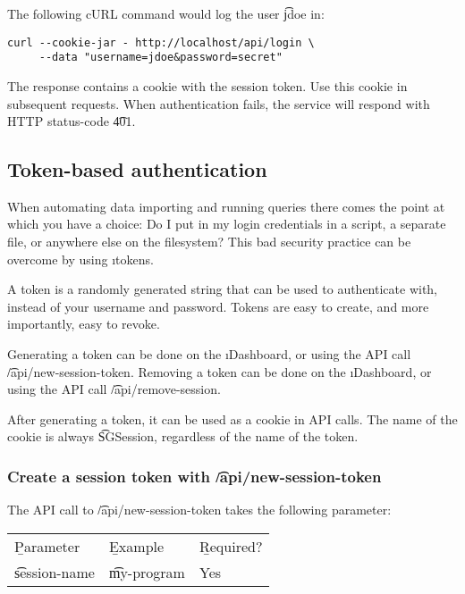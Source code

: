   The following cURL command would log the user \t{jdoe} in:

\begin{lstlisting}
curl --cookie-jar - http://localhost/api/login \
     --data "username=jdoe&password=secret"
\end{lstlisting}

  The response contains a cookie with the session token.  Use this cookie in
  subsequent requests.  When authentication fails, the service will respond
  with HTTP status-code \t{401}.

\subsection{Token-based authentication}
\label{sec:tokens}

  When automating data importing and running queries there comes the point
  at which you have a choice: Do I put in my login credentials in a script,
  a separate file, or anywhere else on the filesystem?  This bad security
  practice can be overcome by using \i{tokens}.

  A token is a randomly generated string that can be used to authenticate
  with, instead of your username and password.  Tokens are easy to create,
  and more importantly, easy to revoke.

  Generating a token can be done on the \i{Dashboard}, or using the API call
  \t{/api/new-session-token}.  Removing a token can be done on the
  \i{Dashboard}, or using the API call \t{/api/remove-session}.

  After generating a token, it can be used as a cookie in API calls.  The name
  of the cookie is always \t{SGSession}, regardless of the name of the
  token.

\subsubsection{Create a session token with \t{/api/new-session-token}}

  The API call to \t{/api/new-session-token} takes the following parameter:

  \hypersetup{urlcolor=black}
  \begin{table}[H]
    \begin{tabularx}{\textwidth}{l!{\VRule[-1pt]}X!{\VRule[-1pt]}X}
      \headrow
      \b{Parameter}    & \b{Example}    & \b{Required?}\\
      \evenrow
      \t{session-name} & \t{my-program} & Yes\\
    \end{tabularx}
  \end{table}
  \hypersetup{urlcolor=LinkGray}

